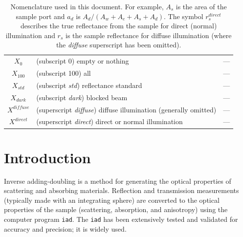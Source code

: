 \documentclass{article}
\newcommand\iadprog{\texttt{iad}}
\begin{document}
\begin{table}[b]
\begin{tabular}{cp{7cm}c}
$X_0$   & (subscript 0) empty or nothing & --- \\
$X_{100}$   & (subscript 100) all & --- \\
$X_\mathit{std}$ & (subscript \textit{std}) reflectance standard & ---\\
$X_\mathit{dark}$ & (subscript \textit{dark}) blocked beam & ---\\
$X^{\mathit{diffuse}}$ & (superscript \textit{diffuse})  diffuse illumination (generally omitted)& ---\\
$X^{\mathit{direct}}$ & (superscript \textit{direct})  direct or normal illumination & ---\\
\end{tabular}
\caption{Nomenclature used in this document.  For example,
$A_s$ is the area of the sample port and $a_d$ is $A_d/(A_w+A_e+A_s+A_d)$.
The symbol
$r_s^\mathit{direct}$ describes the true reflectance from the sample
for direct (normal) illumination and $r_s$ is the sample reflectance
for diffuse illumination (where the \textit{diffuse} superscript has
been omitted).}
\end{table}


\clearpage
\section{Introduction}

Inverse adding-doubling is a method for generating the optical properties of
scattering and absorbing materials.  Reflection and transmission measurements (typically made with an
integrating sphere) are converted to the optical properties of the sample
(scattering, absorption, and anisotropy) using the computer program \iadprog{}.
The \iadprog{} has been extensively tested and validated for accuracy and 
precision; it is widely used\cite{chen06,chandra06,gebhart06,mishra06,degrand06,
giraev06,bargo05,bashkatov05,itoh05,zhao05,sardar05,chen05,thennadil05,jaeger05,
drakaki05,bashkatov05a,gebhart05,ramella-roman05,genina05,liu05,collier05,
swartling05,choi05,trivedi05,bashkatov04,klose05,black04,maswadi04,sardar04,
carp04,khan04,kim04,huber04,choi03,zhu03,lin03,collier03,das03,schulkin03,
rath03,swartling03,fabbri03,gannot03,pfefer03,zaccanti02,shimada02,villard02,
moffitt01,sardar01,sefkow01,shimada01,guo01,barton01,sardar01a,troy01,shah01,
du01,shimada00,youn00,morin00,dam00,barton99,balgi99,vries99,barton99a,nau99,
jones99,simpson98,michielsen98,sardar98,smithpeter98,verkruysse98,jacques98,
fukshansky-kaz98,beek97,tuchin97,chan96,vanstaveren97,coremans97,nilsson97,
yaroslavsky96,richardskortum96,sadhwani96,chan96a,nemati96,lin96,vanstaveren95,
vanstaveren96,gardner96,saidi95,proskurin95,papaioannou95,vanstaveren95a,
nilsson95,marquet95,eddowes95,hourdakis95,qu94,pickering94,tuchin94,
vanstaveren94,durkin93,pickering93,pickering93a}. 
\end{document}
